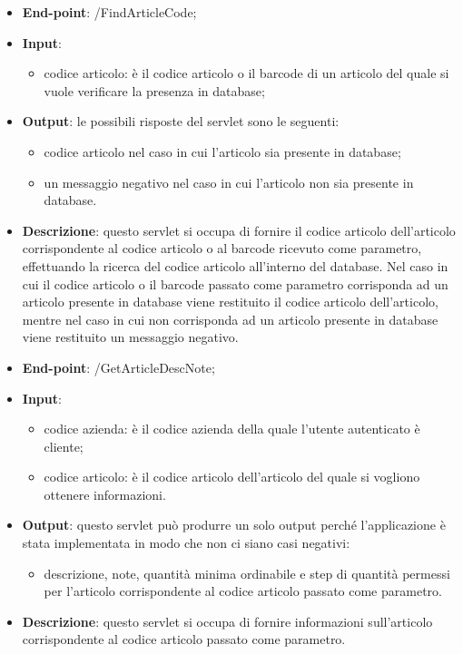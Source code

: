 \begin{itemize}
	\item \textbf{End-point}: /FindArticleCode;
	\item \textbf{Input}:
		\begin{itemize}
			\item codice articolo: è il codice articolo o il barcode di un articolo del quale si vuole verificare la presenza in database;
		\end{itemize}
	\item \textbf{Output}: le possibili risposte del servlet sono le seguenti:
		\begin{itemize}
			\item codice articolo nel caso in cui l'articolo sia presente in database;
			\item un messaggio negativo nel caso in cui l'articolo non sia presente in database.
		\end{itemize}
	\item \textbf{Descrizione}: questo servlet si occupa di fornire il codice articolo dell'articolo corrispondente al codice articolo o al barcode ricevuto come parametro, effettuando la ricerca del codice articolo all'interno del database. Nel caso in cui il codice articolo o il barcode passato come parametro corrisponda ad un articolo presente in database viene restituito il codice articolo dell'articolo, mentre nel caso in cui non corrisponda ad un articolo presente in database viene restituito un messaggio negativo.
\end{itemize}


\begin{itemize}
	\item \textbf{End-point}: /GetArticleDescNote;
	\item \textbf{Input}:
		\begin{itemize}
			\item codice azienda: è il codice azienda della quale l'utente autenticato è cliente;
			\item codice articolo: è il codice articolo dell'articolo del quale si vogliono ottenere informazioni.
		\end{itemize}
	\item \textbf{Output}: questo servlet può produrre un solo output perché l'applicazione è stata implementata in modo che non ci siano casi negativi:
		\begin{itemize}
			\item descrizione, note, quantità minima ordinabile e step di quantità permessi per l'articolo corrispondente al codice articolo passato come parametro.
		\end{itemize}
	\item \textbf{Descrizione}: questo servlet si occupa di fornire informazioni sull'articolo corrispondente al codice articolo passato come parametro. 
\end{itemize}


